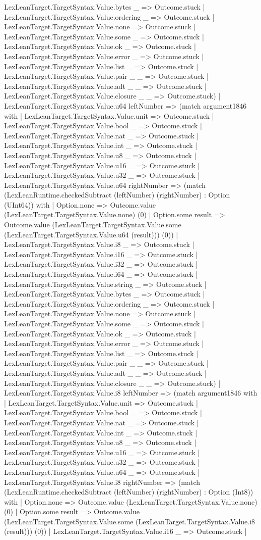 \documentclass[11pt]{article}
\begin{document}
LexLeanTarget.TargetSyntax.Value.bytes \_ => Outcome.stuck | LexLeanTarget.TargetSyntax.Value.ordering \_ => Outcome.stuck | LexLeanTarget.TargetSyntax.Value.none => Outcome.stuck | LexLeanTarget.TargetSyntax.Value.some \_ => Outcome.stuck | LexLeanTarget.TargetSyntax.Value.ok \_ => Outcome.stuck | LexLeanTarget.TargetSyntax.Value.error \_ => Outcome.stuck | LexLeanTarget.TargetSyntax.Value.list \_ => Outcome.stuck | LexLeanTarget.TargetSyntax.Value.pair \_ \_ => Outcome.stuck | LexLeanTarget.TargetSyntax.Value.adt \_ \_ => Outcome.stuck | LexLeanTarget.TargetSyntax.Value.closure \_ \_ => Outcome.stuck) | LexLeanTarget.TargetSyntax.Value.u64 leftNumber => (match argument1846 with | LexLeanTarget.TargetSyntax.Value.unit => Outcome.stuck | LexLeanTarget.TargetSyntax.Value.bool \_ => Outcome.stuck | LexLeanTarget.TargetSyntax.Value.nat \_ => Outcome.stuck | LexLeanTarget.TargetSyntax.Value.int \_ => Outcome.stuck | LexLeanTarget.TargetSyntax.Value.u8 \_ => Outcome.stuck | LexLeanTarget.TargetSyntax.Value.u16 \_ => Outcome.stuck | LexLeanTarget.TargetSyntax.Value.u32 \_ => Outcome.stuck | LexLeanTarget.TargetSyntax.Value.u64 rightNumber => (match (LexLeanRuntime.checkedSubtract (leftNumber) (rightNumber) : Option (UInt64)) with | Option.none => Outcome.value (LexLeanTarget.TargetSyntax.Value.none) (0) | Option.some result => Outcome.value (LexLeanTarget.TargetSyntax.Value.some (LexLeanTarget.TargetSyntax.Value.u64 (result))) (0)) | LexLeanTarget.TargetSyntax.Value.i8 \_ => Outcome.stuck | LexLeanTarget.TargetSyntax.Value.i16 \_ => Outcome.stuck | LexLeanTarget.TargetSyntax.Value.i32 \_ => Outcome.stuck | LexLeanTarget.TargetSyntax.Value.i64 \_ => Outcome.stuck | LexLeanTarget.TargetSyntax.Value.string \_ => Outcome.stuck | LexLeanTarget.TargetSyntax.Value.bytes \_ => Outcome.stuck | LexLeanTarget.TargetSyntax.Value.ordering \_ => Outcome.stuck | LexLeanTarget.TargetSyntax.Value.none => Outcome.stuck | LexLeanTarget.TargetSyntax.Value.some \_ => Outcome.stuck | LexLeanTarget.TargetSyntax.Value.ok \_ => Outcome.stuck | LexLeanTarget.TargetSyntax.Value.error \_ => Outcome.stuck | LexLeanTarget.TargetSyntax.Value.list \_ => Outcome.stuck | LexLeanTarget.TargetSyntax.Value.pair \_ \_ => Outcome.stuck | LexLeanTarget.TargetSyntax.Value.adt \_ \_ => Outcome.stuck | LexLeanTarget.TargetSyntax.Value.closure \_ \_ => Outcome.stuck) | LexLeanTarget.TargetSyntax.Value.i8 leftNumber => (match argument1846 with | LexLeanTarget.TargetSyntax.Value.unit => Outcome.stuck | LexLeanTarget.TargetSyntax.Value.bool \_ => Outcome.stuck | LexLeanTarget.TargetSyntax.Value.nat \_ => Outcome.stuck | LexLeanTarget.TargetSyntax.Value.int \_ => Outcome.stuck | LexLeanTarget.TargetSyntax.Value.u8 \_ => Outcome.stuck | LexLeanTarget.TargetSyntax.Value.u16 \_ => Outcome.stuck | LexLeanTarget.TargetSyntax.Value.u32 \_ => Outcome.stuck | LexLeanTarget.TargetSyntax.Value.u64 \_ => Outcome.stuck | LexLeanTarget.TargetSyntax.Value.i8 rightNumber => (match (LexLeanRuntime.checkedSubtract (leftNumber) (rightNumber) : Option (Int8)) with | Option.none => Outcome.value (LexLeanTarget.TargetSyntax.Value.none) (0) | Option.some result => Outcome.value (LexLeanTarget.TargetSyntax.Value.some (LexLeanTarget.TargetSyntax.Value.i8 (result))) (0)) | LexLeanTarget.TargetSyntax.Value.i16 \_ => Outcome.stuck | 
\end{document}
